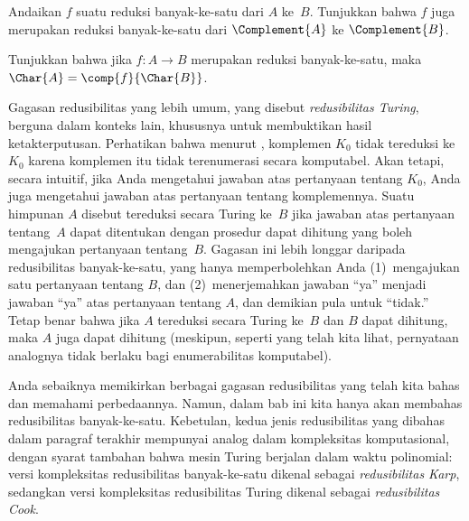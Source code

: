 \documentclass[../../../include/open-logic-section]{subfiles}
\begin{document}
\begin{prob}
Andaikan $f$ suatu reduksi banyak-ke-satu dari $A$ ke~$B$. Tunjukkan bahwa $f$
juga merupakan reduksi banyak-ke-satu dari $\Complement{A}$ ke
$\Complement{B}$.
\end{prob}

\begin{prob}
Tunjukkan bahwa jika $f\colon A \to B$ merupakan reduksi banyak-ke-satu, maka
$\Char{A} = \comp{f}{\Char{B}}$.
\end{prob}

\begin{digress}
Gagasan redusibilitas yang lebih umum, yang disebut \emph{redusibilitas
Turing}, berguna dalam konteks lain, khususnya untuk membuktikan hasil
ketakterputusan. Perhatikan bahwa menurut , komplemen
$K_0$ tidak tereduksi ke~$K_0$ karena komplemen itu tidak terenumerasi secara
komputabel. Akan tetapi, secara intuitif, jika Anda mengetahui jawaban atas
pertanyaan tentang $K_0$, Anda juga mengetahui jawaban atas pertanyaan tentang
komplemennya. Suatu himpunan $A$ disebut tereduksi secara Turing ke~$B$ jika
jawaban atas pertanyaan tentang~$A$ dapat ditentukan dengan prosedur dapat
dihitung yang boleh mengajukan pertanyaan tentang~$B$. Gagasan ini lebih
longgar daripada redusibilitas banyak-ke-satu, yang hanya memperbolehkan Anda
(1)~mengajukan satu pertanyaan tentang $B$, dan (2)~menerjemahkan jawaban ``ya''
menjadi jawaban ``ya'' atas pertanyaan tentang $A$, dan demikian pula untuk
``tidak.'' Tetap benar bahwa jika $A$ tereduksi secara Turing ke~$B$ dan $B$
dapat dihitung, maka $A$ juga dapat dihitung (meskipun, seperti yang telah kita
lihat, pernyataan analognya tidak berlaku bagi enumerabilitas komputabel).

Anda sebaiknya memikirkan berbagai gagasan redusibilitas yang telah kita bahas
dan memahami perbedaannya. Namun, dalam bab ini kita hanya akan membahas
redusibilitas banyak-ke-satu. Kebetulan, kedua jenis redusibilitas yang dibahas
dalam paragraf terakhir mempunyai analog dalam kompleksitas komputasional,
dengan syarat tambahan bahwa mesin Turing berjalan dalam waktu polinomial:
versi kompleksitas redusibilitas banyak-ke-satu dikenal sebagai
\emph{redusibilitas Karp}, sedangkan versi kompleksitas redusibilitas Turing
dikenal sebagai \emph{redusibilitas Cook}.
\end{digress}
\end{document}
